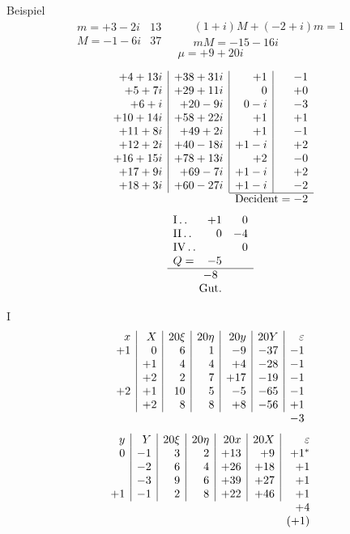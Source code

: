 %
Beispiel
\[
\begin{array}{r|r}
m=+3-2i&13\\
M=-1-6i&37
\end{array}
\qquad
\begin{gathered}
(1+i)M+(-2+i)m=1\\
mM=-15-16i
\end{gathered}
\]
\[
\mu=+9+20i
\]

\[
\begin{array}{r|r|r|r}
+4+13i&+38+31i&+1&-1\\
+5+7i&+29+11i&0&+0\\
+6+i&+20-9i&0-i&-3\\
+10+14i&+58+22i&+1&+1\\
+11+8i&+49+2i&+1&-1\\
+12+2i&+40-18i&+1-i&+2\\
+16+15i&+78+13i&+2&-0\\
+17+9i&+69-7i&+1-i&+2\\
+18+3i&+60-27i&+1-i&-2\\ \cline{3-4}
\multicolumn{2}{c}{}&\multicolumn{2}{c}{\text{Decident}=-2}
\end{array}
\]
\[
\begin{array}{lrr}
\mathrm{I}\dotstwo&+1&0\\
\mathrm{II}\dotstwo&0&-4\\
\mathrm{IV}\dotstwo&&0\\
Q=&-5&\\ \hline
\multicolumn{3}{c}{-8}\\
\multicolumn{3}{c}{\text{Gut.}}
\end{array}
\]

\noindent I
\[
\begin{array}{r|r|r|r|r|r|r}
x&X&20\xi&20\eta&20y&20Y&\varepsilon\\
+1&0&6&1&-9&-37&-1\\
&+1&4&4&+4&-28&-1\\
&+2&2&7&+17&-19&-1\\
+2&+1&10&5&-5&-65&-1\\
&+2&8&8&+8&-56&+1\\
\multicolumn{6}{c}{}&-3
\end{array}
\]
\[
\begin{array}{r|r|r|r|r|r|r}
y&Y&20\xi&20\eta&20x&20X&\varepsilon\\
0&-1&3&2&+13&+9&+1^{*}\\
&-2&6&4&+26&+18&+1\\
&-3&9&6&+39&+27&+1\\
+1&-1&2&8&+22&+46&+1\\
\multicolumn{6}{c}{}&+4\\
\multicolumn{6}{c}{}&(+1)
\end{array}
\]

